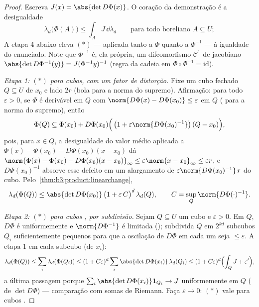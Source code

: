 \begin{proof}
Escreva $J(x) = \abs{\det D\Phi(x)}$. O coração da demonstração é a desigualdade
\[
\lambda_d\bigl(\Phi(A)\bigr) \leq \int_A J\,\dd\lambda_d
\qquad\text{para todo boreliano } A \subseteq U;
\tag{$*$}
\]
A etapa 4 abaixo eleva $(*)$ --- aplicada tanto a $\Phi$ quanto a
$\Phi^{-1}$ --- à igualdade do enunciado. Note que $\Phi^{-1}$ é, ela própria, um
difeomorfismo $\mathcal C^1$ de jacobiano $\abs{\det D\Phi^{-1}(y)} = J(\Phi^{-1}y)^{-1}$ (regra da cadeia em $\Phi\circ\Phi^{-1} = \mathrm{id}$).

\emph{Etapa 1: $(*)$ para cubos, com um fator de distorção.} Fixe um
cubo fechado $Q \subseteq U$ de  $x_0$ e lado $2r$ (bola para a
norma do supremo). Afirmação: para todo $\varepsilon > 0$, se $\Phi$ é derivável
em $Q$ com $\norm{D\Phi(x) - D\Phi(x_0)} \leq \varepsilon$ em $Q$ ( para a norma do
supremo), então
\[
\Phi(Q) \subseteq \Phi(x_0) + D\Phi(x_0)\Bigl(\,\bigl(1 +
\varepsilon\norm{D\Phi(x_0)^{-1}}\bigr)\,(Q - x_0)\Bigr),
\]
pois, para $x \in Q$, a desigualdade do valor médio aplicada a $\Phi(x) - \Phi(x_0) - D\Phi(x_0)(x - x_0)$ dá
$\norm{\Phi(x) - \Phi(x_0) - D\Phi(x_0)(x-x_0)}_\infty \leq
\varepsilon\norm{x - x_0}_\infty \leq \varepsilon r$, e $D\Phi(x_0)^{-1}$ absorve esse defeito em um alargamento de $\varepsilon\norm{D\Phi(x_0)^{-1}}\,r$ do cubo.
Pelo~\cref{thm:b3:product:linearchange},
\[
\lambda_d(\Phi(Q)) \leq \abs{\det D\Phi(x_0)}\,
\bigl(1 + \varepsilon\,C\bigr)^{d}\,\lambda_d(Q),
\qquad C = \sup_{Q}\norm{D\Phi(\cdot)^{-1}} .
\]

\emph{Etapa 2: $(*)$ para cubos , por subdivisão.} Sejam
$Q
\subseteq U$ um cubo  e $\varepsilon > 0$. Em $Q$, $D\Phi$ é uniformemente
 e $\norm{D\Phi^{-1}}$ é limitada (); subdivida $Q$ em
$2^{kd}$ subcubos $Q_i$ suficientemente pequenos para que a
oscilação de $D\Phi$ em cada um seja $\leq \varepsilon$. A etapa 1 em cada
subcubo (de  $x_i$):
\[
\lambda_d(\Phi(Q)) \leq \sum_i\lambda_d(\Phi(Q_i))
\leq (1 + C\varepsilon)^d \sum_i \abs{\det
D\Phi(x_i)}\,\lambda_d(Q_i)
\leq (1 + C\varepsilon)^d\Bigl(\int_Q J + \varepsilon'\Bigr),
\]
a última passagem porque $\sum_i\abs{\det D\Phi(x_i)}\mathbf
1_{Q_i} \to J$ uniformemente em $Q$ ( de
$\det D\Phi$) --- comparação com somas de Riemann. Faça $\varepsilon \to 0$: $(*)$ vale
para cubos .


\end{proof}
